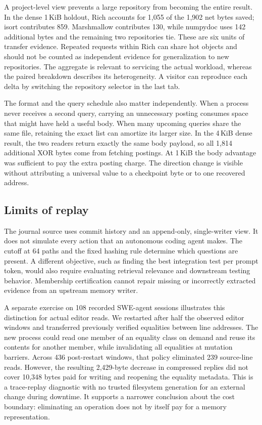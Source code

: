\documentclass[conference]{IEEEtran}
\begin{document}
A project-level view prevents a large repository from becoming the entire result. In the dense 1\,KiB holdout, Rich accounts for 1,055 of the 1,902 net bytes saved; isort contributes 859. Marshmallow contributes 130, while numpydoc uses 142 additional bytes and the remaining two repositories tie. These are six units of transfer evidence. Repeated requests within Rich can share hot objects and should not be counted as independent evidence for generalization to new repositories. The aggregate is relevant to servicing the actual workload, whereas the paired breakdown describes its heterogeneity. A visitor can reproduce each delta by switching the repository selector in the last tab.

The format and the query schedule also matter independently. When a process never receives a second query, carrying an unnecessary posting consumes space that might have held a useful body. When many upcoming queries share the same file, retaining the exact list can amortize its larger size. In the 4\,KiB dense result, the two readers return exactly the same body payload, so all 1,814 additional XOR bytes come from fetching postings. At 1\,KiB the body advantage was sufficient to pay the extra posting charge. The direction change is visible without attributing a universal value to a checkpoint byte or to one recovered address.

\subsection{Limits of replay}
The journal source uses commit history and an append-only, single-writer view. It does not simulate every action that an autonomous coding agent makes. The cutoff at 64 paths and the fixed hashing rule determine which questions are present. A different objective, such as finding the best integration test per prompt token, would also require evaluating retrieval relevance and downstream testing behavior. Membership certification cannot repair missing or incorrectly extracted evidence from an upstream memory writer.

A separate exercise on 108 recorded SWE-agent sessions illustrates this distinction for actual editor reads. We restarted after half the observed editor windows and transferred previously verified equalities between line addresses. The new process could read one member of an equality class on demand and reuse its contents for another member, while invalidating all equalities at mutation barriers. Across 436 post-restart windows, that policy eliminated 239 source-line reads. However, the resulting 2,429-byte decrease in compressed replies did not cover 10,348 bytes paid for writing and reopening the equality metadata. This is a trace-replay diagnostic with no trusted filesystem generation for an external change during downtime. It supports a narrower conclusion about the cost boundary: eliminating an operation does not by itself pay for a memory representation.
\end{document}
